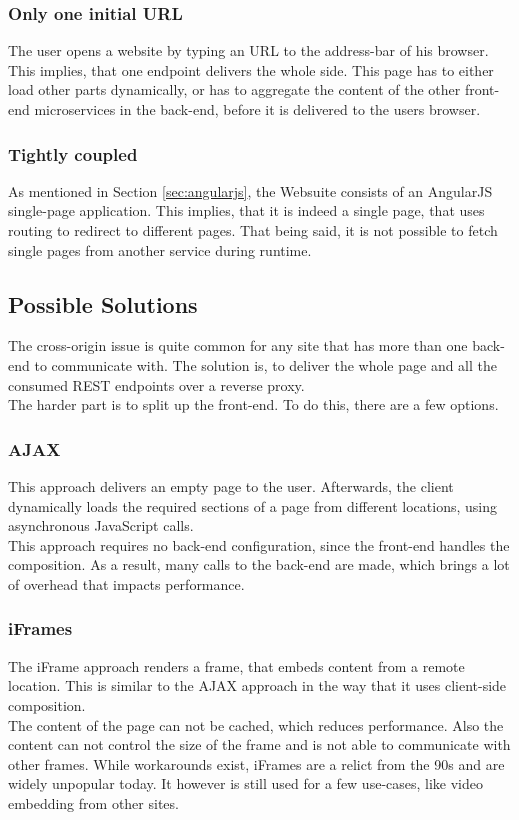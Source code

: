 \subsubsection{Only one initial URL}
The user opens a website by typing an URL to the address-bar of his browser. This implies, that one endpoint delivers the whole side. This page has to either load other parts dynamically, or has to aggregate the content of the other front-end microservices in the back-end, before it is delivered to the users browser.

\subsubsection{Tightly coupled}
As mentioned in Section \ref{sec:angularjs}, the Websuite consists of an AngularJS single-page application. This implies, that it is indeed a single page, that uses routing to redirect to different pages. That being said, it is not possible to fetch single pages from another service during runtime.

\subsection{Possible Solutions}
The cross-origin issue is quite common for any site that has more than one back-end to communicate with. The solution is, to deliver the whole page and all the consumed REST endpoints over a reverse proxy.\\
The harder part is to split up the front-end. To do this, there are a few options.

\subsubsection{AJAX}
This approach delivers an empty page to the user. Afterwards, the client dynamically loads the required sections of a page from different locations, using asynchronous JavaScript calls.\\
This approach requires no back-end configuration, since the front-end handles the composition. As a result, many calls to the back-end are made, which brings a lot of overhead that impacts performance.

\subsubsection{iFrames}
The iFrame approach renders a frame, that embeds content from a remote location. This is similar to the AJAX approach in the way that it uses client-side composition.\\
The content of the page can not be cached, which reduces performance. Also the content can not control the size of the frame and is not able to communicate with other frames. While workarounds exist, iFrames are a relict from the 90s and are widely unpopular today. It however is still used for a few use-cases, like video embedding from other sites.

